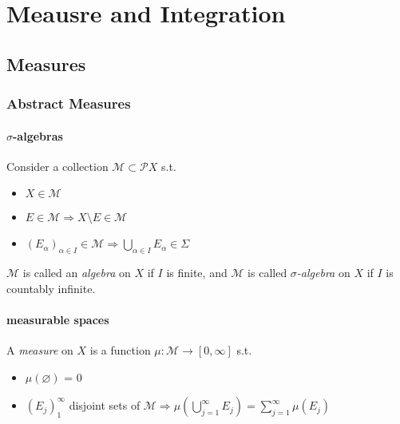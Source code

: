 \part{Meausre and Integration}

\chapter{Measures}

\section{Abstract Measures}

\subsection{\texorpdfstring{\(\sigma\)}{sigma}-algebras}

\begin{definition}
    Consider a collection \( \mathcal{M} \subset \mathcal{P}X \) s.t.
    \begin{itemize}
        \item \( X \in \mathcal{M} \)
        \item \( E \in \mathcal{M} \Rightarrow X \setminus E \in \mathcal{M} \)
        \item \( \left( E_\alpha \right)_{\alpha \in I} \in \mathcal{M} \Rightarrow \bigcup_{\alpha \in I} E_{\alpha} \in \Sigma \) 
    \end{itemize}
    \(\mathcal{M}\) is called an \emph{algebra} on \(X\) if \(I\) is finite, and \(\mathcal{M}\) is called \emph{\(\sigma\)-algebra} on \(X\) if \(I\) is countably infinite.
\end{definition}

\subsection{measurable spaces}
\begin{definition}
    A \emph{measure} on \(X\) is a function \(\mu:\mathcal{M} \to [0,\infty]\) s.t.
    \begin{itemize}
        \item \(\mu(\varnothing)\) = 0
        \item \(\left( E_j \right)_{1}^{\infty} \) disjoint sets of  \(\mathcal{M} \Rightarrow \mu(\bigcup_{j=1}^{\infty} E_j) = \sum_{j=1}^{\infty} \mu(E_j) \)
    \end{itemize}
\end{definition}

